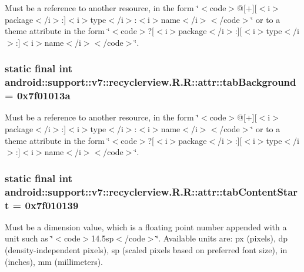 Must be a reference to another resource, in the form \char`\"{}$<$code$>$@\mbox{[}+\mbox{]}\mbox{[}$<$i$>$package$<$/i$>$:\mbox{]}$<$i$>$type$<$/i$>$:$<$i$>$name$<$/i$>$$<$/code$>$\char`\"{} or to a theme attribute in the form \char`\"{}$<$code$>$?\mbox{[}$<$i$>$package$<$/i$>$:\mbox{]}\mbox{[}$<$i$>$type$<$/i$>$:\mbox{]}$<$i$>$name$<$/i$>$$<$/code$>$\char`\"{}. \hypertarget{classandroid_1_1support_1_1v7_1_1recyclerview_1_1_r_1_1attr_7c059b6fad4d152a2f7b769993a0b220}{
\subsubsection[{tabBackground}]{\setlength{\rightskip}{0pt plus 5cm}static final int android::support::v7::recyclerview.R.R::attr::tabBackground = 0x7f01013a}}
\label{classandroid_1_1support_1_1v7_1_1recyclerview_1_1_r_1_1attr_7c059b6fad4d152a2f7b769993a0b220}


Must be a reference to another resource, in the form \char`\"{}$<$code$>$@\mbox{[}+\mbox{]}\mbox{[}$<$i$>$package$<$/i$>$:\mbox{]}$<$i$>$type$<$/i$>$:$<$i$>$name$<$/i$>$$<$/code$>$\char`\"{} or to a theme attribute in the form \char`\"{}$<$code$>$?\mbox{[}$<$i$>$package$<$/i$>$:\mbox{]}\mbox{[}$<$i$>$type$<$/i$>$:\mbox{]}$<$i$>$name$<$/i$>$$<$/code$>$\char`\"{}. \hypertarget{classandroid_1_1support_1_1v7_1_1recyclerview_1_1_r_1_1attr_e9b281168a92980146b635ce9f0b5cad}{
\subsubsection[{tabContentStart}]{\setlength{\rightskip}{0pt plus 5cm}static final int android::support::v7::recyclerview.R.R::attr::tabContentStart = 0x7f010139}}
\label{classandroid_1_1support_1_1v7_1_1recyclerview_1_1_r_1_1attr_e9b281168a92980146b635ce9f0b5cad}


Must be a dimension value, which is a floating point number appended with a unit such as \char`\"{}$<$code$>$14.5sp$<$/code$>$\char`\"{}. Available units are: px (pixels), dp (density-independent pixels), sp (scaled pixels based on preferred font size), in (inches), mm (millimeters). 

